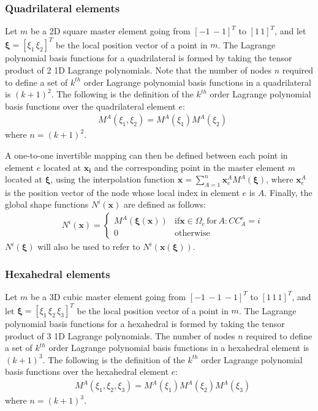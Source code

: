 	\subsubsection{Quadrilateral elements}
	
	Let $m$ be a 2D square master element going from $[-1 \, -1]^T$ to $[1 \, 1]^T$, and let $\bm{\xi} = [\xi_1 \, \xi_2]^T$ be the local position vector of a point in $m$. The Lagrange polynomial basis functions for a quadrilateral is formed by taking the tensor product of 2 1D Lagrange polynomials. Note that the number of nodes $n$ required to define a set of $k^{th}$ order Lagrange polynomial basis functions in a quadrilateral is $(k+1)^2$. The following is the definition of the $k^{th}$ order Lagrange polynomial basis functions over the quadrilateral element $e$:
	\begin{align}
		& M^{A}(\xi_1, \xi_2) = M^{A}(\xi_1)M^{A}(\xi_2)
	\end{align}
	where $n = (k+1)^2$. 

	A one-to-one invertible mapping can then be defined between each point in element $e$ located at $\bm{x_i}$ and the corresponding point in the master element $m$ located at $\bm{\xi}$, using the interpolation function $\bm{x} = \sum_{A=1}^{n} \bm{x}^A_e M^{A}(\bm{\xi})$, where $\bm{x}^A_e$ is the position vector of the node whose local index in element $e$ is $A$. Finally, the global shape functions $N^i(\bm{x})$ are defined as follows:
	\begin{align}
		& N^i(\bm{x}) = \begin{cases}
			M^{A}(\bm{\xi}(\bm{x})) & \text{if} \bm{x} \in \Omega_e \, \text{for} \, A: CC^e_A = i\\
			0 & \text{otherwise}
		\end{cases}
	\end{align}
	$N^i(\bm{\xi})$ will also be used to refer to $N^i(\bm{x}(\bm{\xi}))$.

	\subsubsection{Hexahedral elements}

	Let $m$ be a 3D cubic master element going from $[-1 \, -1 \, -1]^T$ to $[1 \, 1 \, 1]^T$, and let $\bm{\xi} = [\xi_1 \, \xi_2 \, \xi_3]^T$ be the local position vector of a point in $m$. The Lagrange polynomial basis functions for a hexahedral is formed by taking the tensor product of 3 1D Lagrange polynomials. The number of nodes $n$ required to define a set of $k^{th}$ order Lagrange polynomial basis functions in a hexahedral element is $(k+1)^3$. The following is the definition of the $k^{th}$ order Lagrange polynomial basis functions over the hexahedral element $e$:
	\begin{align}
		& M^{A}(\xi_1, \xi_2, \xi_3) = M^{A}(\xi_1)M^{A}(\xi_2)M^{A}(\xi_3)
	\end{align}
	where $n = (k+1)^3$. 

